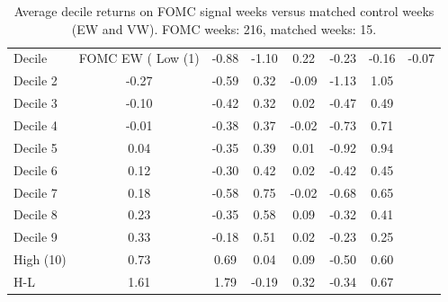 \begin{table}[ht]
\centering
\caption{Average decile returns on FOMC signal weeks versus matched control weeks (EW and VW). FOMC weeks: 216, matched weeks: 15.}
\label{tab:decile_regime}
\begin{tabular}{lcccccc}
\toprule
Decile & FOMC EW (%
\midrule
Low (1) & -0.88 & -1.10 & 0.22 & -0.23 & -0.16 & -0.07 \\
Decile 2 & -0.27 & -0.59 & 0.32 & -0.09 & -1.13 & 1.05 \\
Decile 3 & -0.10 & -0.42 & 0.32 & 0.02 & -0.47 & 0.49 \\
Decile 4 & -0.01 & -0.38 & 0.37 & -0.02 & -0.73 & 0.71 \\
Decile 5 & 0.04 & -0.35 & 0.39 & 0.01 & -0.92 & 0.94 \\
Decile 6 & 0.12 & -0.30 & 0.42 & 0.02 & -0.42 & 0.45 \\
Decile 7 & 0.18 & -0.58 & 0.75 & -0.02 & -0.68 & 0.65 \\
Decile 8 & 0.23 & -0.35 & 0.58 & 0.09 & -0.32 & 0.41 \\
Decile 9 & 0.33 & -0.18 & 0.51 & 0.02 & -0.23 & 0.25 \\
High (10) & 0.73 & 0.69 & 0.04 & 0.09 & -0.50 & 0.60 \\
H-L & 1.61 & 1.79 & -0.19 & 0.32 & -0.34 & 0.67 \\
\bottomrule
\end{tabular}
\end{table}
